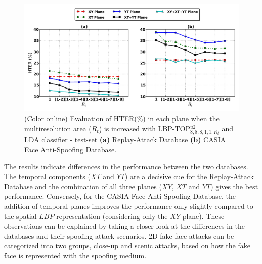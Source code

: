 \begin{figure}[!htb]
\begin{center}
\includegraphics [width=\textwidth] {images/proposed_countermeasure/planes_evaluation_LDA.pdf}
\caption{(Color online) Evaluation of HTER(\%) in each plane when the multiresolution area ($R_t$) is increased with LBP-TOP$_{8,8,8,1,1,R_t}^{u2}$ and LDA classifier - test-set \textbf{(a)} Replay-Attack Database \textbf{(b)} CASIA Face Anti-Spoofing Database.} \label{fig:planes_evaluation_LDA}
\end{center}
\end{figure}

The results indicate differences in the performance between the two databases. The temporal components ($XT$ and $YT$) are a decisive cue for the Replay-Attack Database and the combination of all three planes ($XY$, $XT$ and $YT$) gives the best performance. Conversely, for the CASIA Face Anti-Spoofing Database, the addition of temporal planes improves the performance only slightly compared to the spatial $LBP$ representation (considering only the $XY$ plane). These observations can be explained by taking a closer look at the differences in the databases and their spoofing attack scenarios. 2D fake face attacks can be categorized into two groups, close-up and scenic attacks, based on how the fake face is represented with the spoofing medium.

